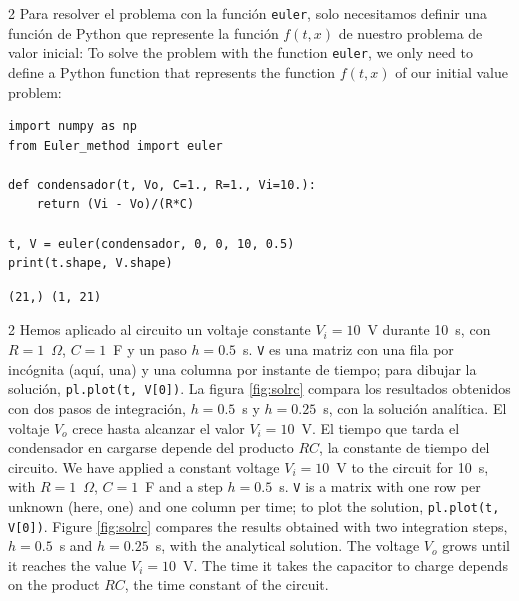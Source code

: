 \begin{paracol}{2}
Para resolver el problema con la función \texttt{euler}, solo necesitamos definir una función de Python que represente la función $f(t,x)$ de nuestro problema de valor inicial:
\switchcolumn
To solve the problem with the function \texttt{euler}, we only need to define a Python function that represents the function $f(t,x)$ of our initial value problem:
\end{paracol}
\begin{verbatim}
import numpy as np
from Euler_method import euler

def condensador(t, Vo, C=1., R=1., Vi=10.):
    return (Vi - Vo)/(R*C)

t, V = euler(condensador, 0, 0, 10, 0.5)
print(t.shape, V.shape)
\end{verbatim}
\begin{verbatim}
(21,) (1, 21)
\end{verbatim}
\begin{paracol}{2}
Hemos aplicado al circuito un voltaje constante $V_i=10$~V durante 10~s, con $R=1$~$\Omega$, $C=1$~F y un paso $h=0.5$~s. \texttt{V} es una matriz con una fila por incógnita (aquí, una) y una columna por instante de tiempo; para dibujar la solución, \texttt{pl.plot(t, V[0])}. La figura \ref{fig:solrc} compara los resultados obtenidos con dos pasos de integración, $h=0.5$~s y $h=0.25$~s, con la solución analítica. El voltaje $V_o$ crece hasta alcanzar el valor $V_i=10$~V. El tiempo que tarda el condensador en cargarse depende del producto $RC$, la constante de tiempo del circuito.
\switchcolumn
We have applied a constant voltage $V_i=10$~V to the circuit for 10~s, with $R=1$~$\Omega$, $C=1$~F and a step $h=0.5$~s. \texttt{V} is a matrix with one row per unknown (here, one) and one column per time; to plot the solution, \texttt{pl.plot(t, V[0])}. Figure \ref{fig:solrc} compares the results obtained with two integration steps, $h=0.5$~s and $h=0.25$~s, with the analytical solution. The voltage $V_o$ grows until it reaches the value $V_i = 10$~V. The time it takes the capacitor to charge depends on the product $RC$, the time constant of the circuit.
\end{paracol}

